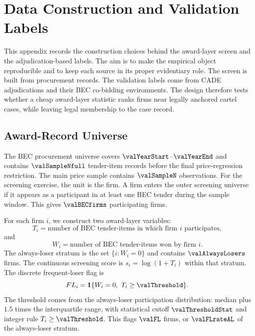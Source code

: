 \section{Data Construction and Validation Labels}
\label{app:data_labels_submission}

This appendix records the construction choices behind the
award-layer screen and the adjudication-based labels. The aim is
to make the empirical object reproducible and to keep each
source in its proper evidentiary role. The screen is built from
procurement records. The validation labels come from CADE
adjudications and their BEC co-bidding environments. The design
therefore tests whether a cheap award-layer statistic ranks
firms near legally anchored cartel cases, while leaving legal
membership to the case record.

\subsection{Award-Record Universe}
\label{app:award_universe_submission}

The BEC procurement universe covers $\valYearStart$--$\valYearEnd$
and contains $\valSampleNfull$ tender-item records before the
final price-regression restriction. The main price sample contains
$\valSampleN$ observations. For the screening exercise, the unit
is the firm. A firm enters the outer screening universe if it
appears as a participant in at least one BEC tender during the
sample window. This gives $\valBECfirms$ participating firms.

For each firm $i$, we construct two award-layer variables:
\[
  T_i=\text{number of BEC tender-items in which firm } i
  \text{ participates},
\]
and
\[
  W_i=\text{number of BEC tender-items won by firm } i.
\]
The always-loser stratum is the set $\{i:W_i=0\}$ and contains
$\valAlwaysLosers$ firms. The continuous screening score is
$s_i=\log(1+T_i)$ within that stratum. The discrete frequent-loser
flag is
\[
  FL_i=\mathbf{1}\{W_i=0,\ T_i\geq\valThreshold\}.
\]
The threshold comes from the always-loser participation
distribution: median plus $1.5$ times the interquartile range,
with statistical cutoff $\valThresholdStat$ and integer rule
$T_i\geq\valThreshold$. This flags $\valFL$ firms, or
$\valFLrateAL$ of the always-loser stratum.

